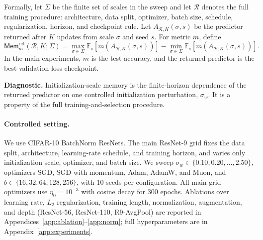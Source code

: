\documentclass{article}
\newcommand{\Mem}{\mathsf{Mem}}
\newcommand{\sigw}{\sigma_w}
\newcommand{\pier}[1]{{\color{red} Pier: #1}}
\begin{document}
Formally, let \(\Sigma\) be the finite set of scales in the sweep and let
\(\mathcal R\) denotes the full training procedure: architecture, data split,
optimizer, batch size, schedule, regularization, horizon, and checkpoint rule.
Let \(A_{\mathcal R,K}(\sigma,s)\) be the predictor returned after \(K\) updates
from scale \(\sigma\) and seed \(s\). For metric \(m\), define
\[
    \Mem_m^{\mathrm{ret}}(\mathcal R,K;\Sigma)
    =
    \max_{\sigma\in\Sigma}
    \mathbb E_s[
        m(A_{\mathcal R,K}(\sigma,s))
    ]
    -
    \min_{\sigma\in\Sigma}
    \mathbb E_s[
        m(A_{\mathcal R,K}(\sigma,s))
    ].
\]
In the main experiments, \(m\) is the test accuracy, and the returned predictor is
the best-validation-loss checkpoint.

\begin{summarybox}
\textbf{Diagnostic.}
Initialization-scale memory is the finite-horizon dependence of the returned predictor on one controlled initialization perturbation, \(\sigw\). It is a property of the full training-and-selection procedure.
\end{summarybox}
\paragraph{Controlled setting.}
We use CIFAR-10 BatchNorm ResNets. The main ResNet-9 grid fixes the
data split, architecture, learning-rate schedule, and training horizon, and varies only initialization scale, optimizer, and batch size. We sweep
$\sigw\in\{0.10,0.20,\ldots,2.50\}$,
optimizers SGD, SGD with momentum, Adam, AdamW, and Muon, and
$b\in\{16,32,64,128,256\}$,
with \(10\) seeds per configuration. All main-grid optimizers use
\(\eta_0=10^{-3}\) with cosine decay for \(300\) epochs.
Ablations over learning rate, $L_2$ regularization, training
length, normalization, augmentation, and depth (ResNet-56, ResNet-110, R9-AvgPool) are reported in
Appendices~\ref{app:ablation}--\ref{app:norm};
full hyperparameters are in Appendix~\ref{app:experiments}.
\end{document}
